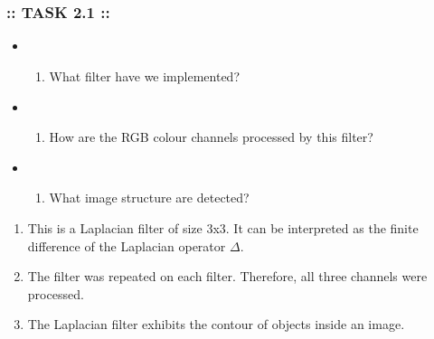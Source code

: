 \documentclass[11pt]{article}
\providecommand{\tightlist}{%
      \setlength{\itemsep}{0pt}\setlength{\parskip}{0pt}}
\begin{document}
    \begin{center}
    \end{center}
    { \hspace*{\fill} \\}
    
    \begin{center}
    \end{center}
    { \hspace*{\fill} \\}
    
    \hypertarget{task-2.1}{%
\subsubsection{:: TASK 2.1 ::}\label{task-2.1}}

\begin{itemize}
\item
  \begin{enumerate}
  \def\labelenumi{\roman{enumi}.}
  \tightlist
  \item
    What filter have we implemented?
  \end{enumerate}
\item
  \begin{enumerate}
  \def\labelenumi{\roman{enumi}.}
  \setcounter{enumi}{1}
  \tightlist
  \item
    How are the RGB colour channels processed by this filter?
  \end{enumerate}
\item
  \begin{enumerate}
  \def\labelenumi{\roman{enumi}.}
  \setcounter{enumi}{2}
  \tightlist
  \item
    What image structure are detected?
  \end{enumerate}
\end{itemize}

    \begin{enumerate}
\def\labelenumi{\roman{enumi}.}
\item
  This is a Laplacian filter of size 3x3. It can be interpreted as the
  finite difference of the Laplacian operator \(\Delta\).
\item
  The filter was repeated on each filter. Therefore, all three channels
  were processed.
\item
  The Laplacian filter exhibits the contour of objects inside an image.
\end{enumerate}
\end{document}

